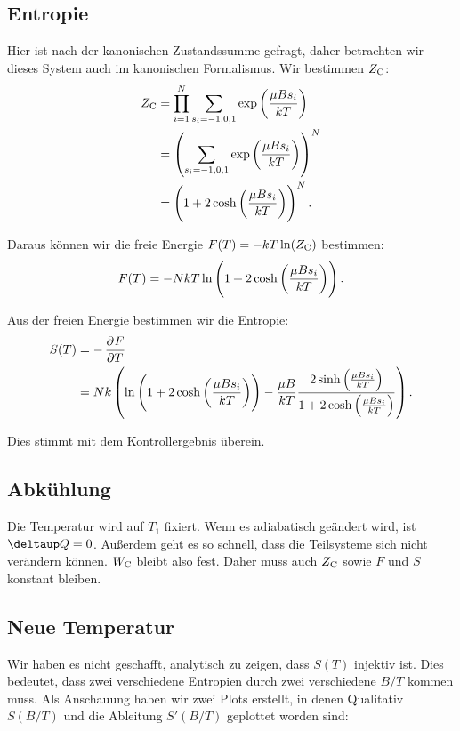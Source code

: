 \subsection{Entropie}

Hier ist nach der kanonischen Zustandssumme gefragt, daher betrachten wir dieses System auch im kanonischen Formalismus. Wir bestimmen $Z_\text C$:
\begin{align*}
    Z_\text C
    &= \prod_{i=1}^N \sum_{s_i = -1, 0, 1} \exp\del{\frac{\mu B s_i}{k T}} \\
    &= \del{\sum_{s_i = -1, 0, 1} \exp\del{\frac{\mu B s_i}{k T}}}^N \\
    &= \del{1 + 2 \cosh\del{\frac{\mu B s_i}{k T}}}^N.
\end{align*}

Daraus können wir die freie Energie $F(T) = - k T \ln(Z_\text C)$ bestimmen:
\[
    F(T) = - N k T \ln\del{1 + 2 \cosh\del{\frac{\mu B s_i}{k T}}}.
\]

Aus der freien Energie bestimmen wir die Entropie:
\begin{align*}
    S(T)
    &= - \dpd FT \\
    &= N k \del{
        \ln\del{1 + 2 \cosh\del{\frac{\mu B s_i}{k T}}}
        - \frac{\mu B}{kT} \frac{2 \sinh\del{\frac{\mu B s_i}{k T}}}{1 + 2\cosh\del{\frac{\mu B s_i}{k T}}}
    }.
\end{align*}

Dies stimmt mit dem Kontrollergebnis überein.

\subsection{Abkühlung}

Die Temperatur wird auf $T_1$ fixiert. Wenn es adiabatisch geändert wird, ist
$\deltaup Q = 0$. Außerdem geht es so schnell, dass die Teilsysteme sich nicht
verändern können. $W_\text C$ bleibt also fest. Daher muss auch $Z_\text C$
sowie $F$ und $S$ konstant bleiben.

\subsection{Neue Temperatur}

Wir haben es nicht geschafft, analytisch zu zeigen, dass $S(T)$ injektiv ist.
Dies bedeutet, dass zwei verschiedene Entropien durch zwei verschiedene $B/T$
kommen muss. Als Anschauung haben wir zwei Plots erstellt, in denen Qualitativ
$S(B/T)$ und die Ableitung $S'(B/T)$ geplottet worden sind:

